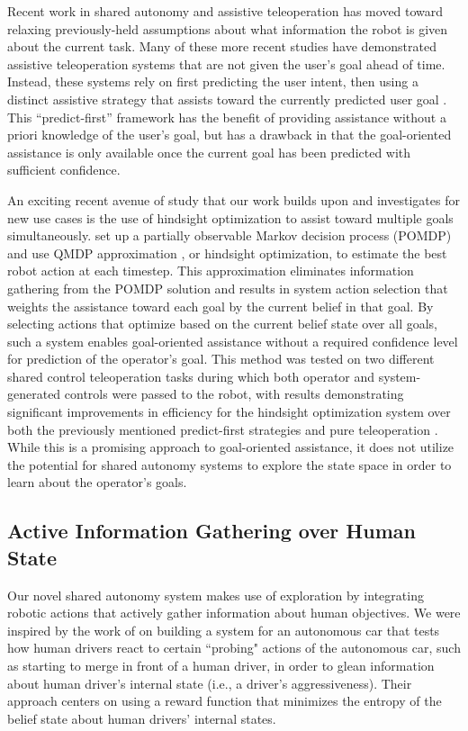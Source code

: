 \documentclass[conference]{IEEEtran}
\begin{document}
Recent work in shared autonomy and assistive teleoperation has moved toward relaxing previously-held assumptions about what information the robot is given about the current task. Many of these more recent studies have demonstrated assistive teleoperation systems that are not given the user's goal ahead of time. Instead, these systems rely on first predicting the user intent, then using a distinct assistive strategy that assists toward the currently predicted user goal \cite{dragan2012formalizing, fagg2004extracting, kragic2005human, schultz2017goal, yu2005telemanipulation}. This ``predict-first'' framework has the benefit of providing assistance without a priori knowledge of the user's goal, but has a drawback in that the goal-oriented assistance is only available once the current goal has been predicted with sufficient confidence. 

An exciting recent avenue of study that our work builds upon and investigates for new use cases is the use of hindsight optimization to assist toward multiple goals simultaneously. \citet{javdani2015shared} set up a partially observable Markov decision process (POMDP) and use QMDP approximation \cite{littman1995learning}, or hindsight optimization, to estimate the best robot action at each timestep. This approximation eliminates information gathering from the POMDP solution and results in system action selection that weights the assistance toward each goal by the current belief in that goal. By selecting actions that optimize based on the current belief state over all goals, such a system enables goal-oriented assistance without a required confidence level for prediction of the operator's goal. This method was tested on two different shared control teleoperation tasks during which both operator and system-generated controls were passed to the robot, with results demonstrating significant improvements in efficiency for the hindsight optimization system over both the previously mentioned predict-first strategies and pure teleoperation \cite{javdani2018shared}. While this is a promising approach to goal-oriented assistance, it does not utilize the potential for shared autonomy systems to explore the state space in order to learn about the operator's goals.

\subsection{Active Information Gathering over Human State}
Our novel shared autonomy system makes use of exploration by integrating robotic actions that actively gather information about human objectives. We were inspired by the work of \citet{sadigh2016information} on building a system for an autonomous car that tests how human drivers react to certain ``probing" actions of the autonomous car, such as starting to merge in front of a human driver, in order to glean information about human driver's internal state (i.e., a driver's aggressiveness). Their approach centers on using a reward function that minimizes the entropy of the belief state about human drivers' internal states.
\end{document}
